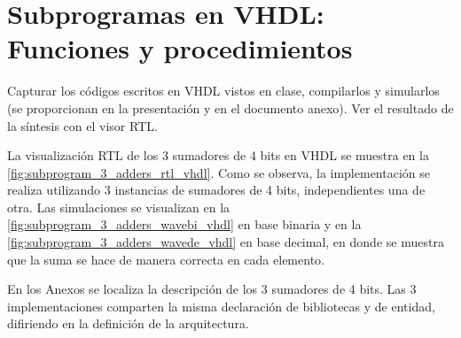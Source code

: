 \section{Subprogramas en VHDL: Funciones y procedimientos \label{sec:s1}}

\begin{center}
	\begin{minipage}{12cm}
		\begin{tcolorbox}[title=Actividad 1]
			Capturar los códigos escritos en VHDL vistos en clase, compilarlos y simularlos (se proporcionan en la presentación y en el documento anexo). Ver el resultado de la síntesis con el visor RTL.
		\end{tcolorbox}	
	\end{minipage}
\end{center}

La visualización RTL de los 3 sumadores de 4 bits en VHDL se muestra en la \autoref{fig:subprogram_3_adders_rtl_vhdl}. Como se observa, la implementación se realiza utilizando 3 instancias de sumadores de 4 bits, independientes una de otra. Las simulaciones se visualizan en la \autoref{fig:subprogram_3_adders_wavebi_vhdl} en base binaria y en la \autoref{fig:subprogram_3_adders_wavede_vhdl} en base decimal, en donde se muestra que la suma se hace de manera correcta en cada elemento.

En los Anexos se localiza la descripción de los 3 sumadores de 4 bits. Las 3 implementaciones comparten la misma declaración de bibliotecas y de entidad, difiriendo en la definición de la arquitectura.

